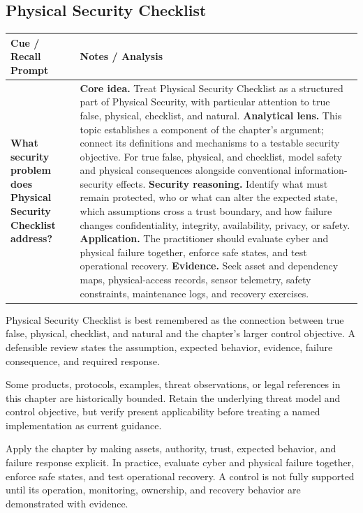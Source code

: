 \documentclass[11pt]{article}
\newcommand{\CornellHeader}{%
\rowcolor{Navy}\color{white}\bfseries Cue / Recall Prompt & \color{white}\bfseries Notes / Analysis\\\hline}
\newcommand{\CornellRow}[2]{%
\cellcolor{CueGray}\RaggedRight\textbf{#1} & \RaggedRight #2\\\hline}
\begin{document}
\subsection*{Physical Security Checklist}
\begin{longtable}{>{\RaggedRight\arraybackslash}p{}|>{\RaggedRight\arraybackslash}p{}}
\CornellHeader
\CornellRow{What security problem does Physical Security Checklist address?}{\textbf{Core idea.} Treat Physical Security Checklist as a structured part of Physical Security, with particular attention to true false, physical, checklist, and natural. \textbf{Analytical lens.} This topic establishes a component of the chapter's argument; connect its definitions and mechanisms to a testable security objective. For true false, physical, and checklist, model safety and physical consequences alongside conventional information-security effects. \textbf{Security reasoning.} Identify what must remain protected, who or what can alter the expected state, which assumptions cross a trust boundary, and how failure changes confidentiality, integrity, availability, privacy, or safety. \textbf{Application.} The practitioner should evaluate cyber and physical failure together, enforce safe states, and test operational recovery. \textbf{Evidence.} Seek asset and dependency maps, physical-access records, sensor telemetry, safety constraints, maintenance logs, and recovery exercises.}
\end{longtable}
\begin{topicsummary}
Physical Security Checklist is best remembered as the connection between true false, physical, checklist, and natural and the chapter's larger control objective. A defensible review states the assumption, expected behavior, evidence, failure consequence, and required response.
\end{topicsummary}
\begin{historybox}
Some products, protocols, examples, threat observations, or legal references in this chapter are historically bounded. Retain the underlying threat model and control objective, but verify present applicability before treating a named implementation as current guidance.
\end{historybox}
\begin{defensebox}
Apply the chapter by making assets, authority, trust, expected behavior, and failure response explicit. In practice, evaluate cyber and physical failure together, enforce safe states, and test operational recovery. A control is not fully supported until its operation, monitoring, ownership, and recovery behavior are demonstrated with evidence.
\end{defensebox}
\end{document}
